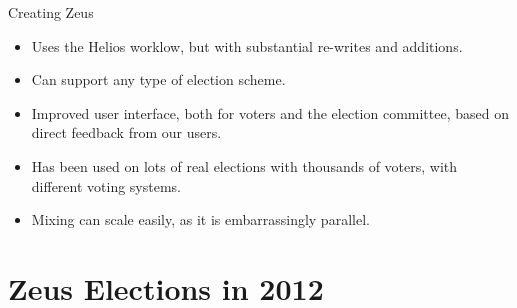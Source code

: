 \documentclass[utf8]{beamer}
\begin{document}
\begin{frame}{Creating Zeus}

\begin{itemize}  
  \item Uses the Helios worklow, but with substantial re-writes and
    additions.
  \item Can support any type of election scheme.
  \item Improved user interface, both for voters and the election
    committee, based on direct feedback from our users.
  \item Has been used on lots of real elections with thousands of
    voters, with different voting systems.
  \item Mixing can scale easily, as it is embarrassingly parallel.
  \end{itemize}
  
\end{frame}

\section{Zeus Elections in 2012}
\end{document}
